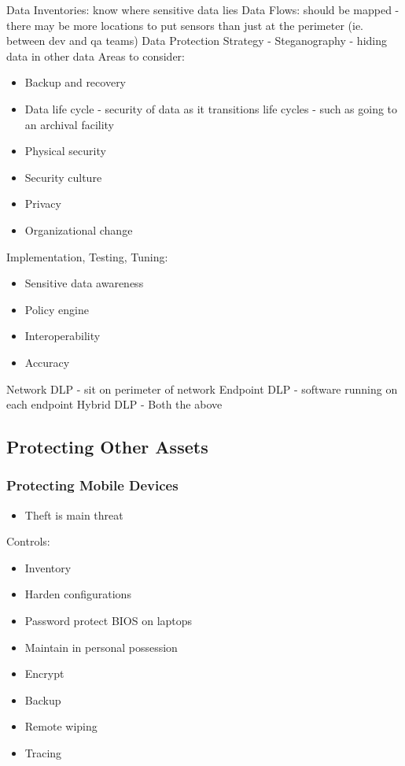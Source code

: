 \documentclass[11pt]{article}
\begin{document}
Data Inventories: know where sensitive data lies
Data Flows: should be mapped - there may be more locations to put sensors than just at the perimeter (ie. between dev and qa teams)
Data Protection Strategy -
  Steganography - hiding data in other data
  Areas to consider:
\begin{itemize}
\item Backup and recovery
\item Data life cycle - security of data as it transitions life cycles - such as going to an archival facility
\item Physical security
\item Security culture
\item Privacy
\item Organizational change
\end{itemize}

Implementation, Testing, Tuning:
\begin{itemize}
\item Sensitive data awareness
\item Policy engine
\item Interoperability
\item Accuracy
\end{itemize}

Network DLP - sit on perimeter of network
Endpoint DLP - software running on each endpoint
Hybrid DLP - Both the above
\subsection{Protecting Other Assets}
\label{sec:orgbd905f8}
\subsubsection{Protecting Mobile Devices}
\label{sec:orgba6993e}
\begin{itemize}
\item Theft is main threat
\end{itemize}

Controls:
\begin{itemize}
\item Inventory
\item Harden configurations
\item Password protect BIOS on laptops
\item Maintain in personal possession
\item Encrypt
\item Backup
\item Remote wiping
\item Tracing
\end{itemize}
\end{document}
